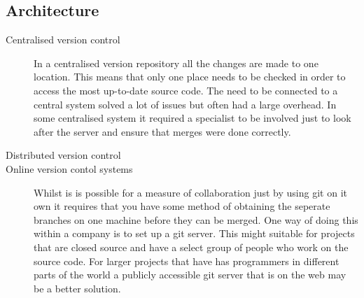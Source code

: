 \subsection{Architecture}
\begin{description}

  \item [Centralised version control] 
  In a centralised version repository all the changes are made to one location.  This means that only one place needs to be checked in order to access the most up-to-date source code. The need to be connected to a central system solved a lot of issues but often had a large overhead.  In some centralised system it required a specialist to be involved just to look after the server and ensure that merges were done correctly.

  \item [Distributed version control] 
    

  \item [Online version contol systems]  
  Whilst is is possible for a measure of collaboration just by using git on it own it requires that you have some method of obtaining the seperate branches on one machine before they can be merged.  One way of doing this within a company is to set up a git server.  This might suitable for projects that are closed source and have a select group of people who work on the source code.  For larger projects that have has programmers in different parts of the world a publicly accessible git server that is on the web may be a better solution.    

  
\end{description}

